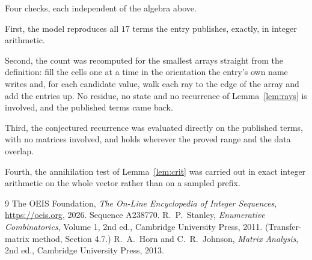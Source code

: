\documentclass[11pt,a4paper]{article}
\theoremstyle{plain}
\theoremstyle{definition}
\begin{document}
Four checks, each independent of the algebra above.

First, the model reproduces all $17$ terms the entry publishes, exactly, in integer
arithmetic.

Second, the count was recomputed for the smallest arrays straight from the definition: fill the
cells one at a time in the orientation the entry's own name writes and, for each candidate
value, walk each ray to the edge of the array and add the entries up. No residue, no state and
no recurrence of Lemma~\ref{lem:rays} is involved, and the published terms came back.

Third, the conjectured recurrence was evaluated directly on the published terms, with no
matrices involved, and holds wherever the proved range and the data overlap.

Fourth, the annihilation test of Lemma~\ref{lem:crit} was carried out in exact integer
arithmetic on the whole vector rather than on a sampled prefix.

\begin{thebibliography}{9}
 The OEIS Foundation, \emph{The On-Line Encyclopedia of Integer
Sequences}, \url{https://oeis.org}, 2026. Sequence A238770.
 R.~P.~Stanley, \emph{Enumerative Combinatorics}, Volume 1, 2nd ed.,
Cambridge University Press, 2011. (Transfer-matrix method, Section 4.7.)
 R.~A.~Horn and C.~R.~Johnson, \emph{Matrix Analysis}, 2nd ed., Cambridge
University Press, 2013.
\end{thebibliography}
\end{document}
